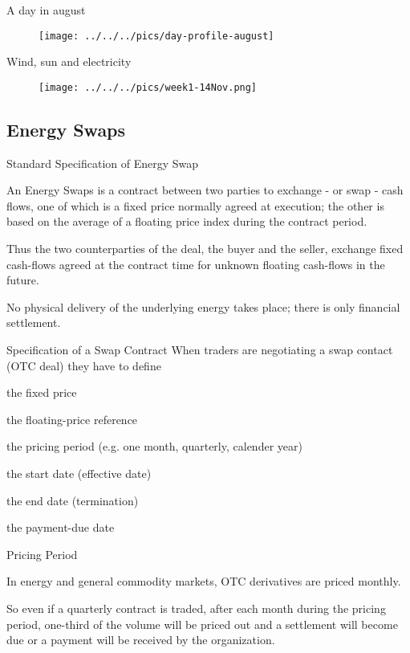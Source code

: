 
{A day in august}
\begin{figure}[htp]
\centering
\texttt{[image: ../../../pics/day-profile-august]}
\end{figure}

{Wind, sun and electricity}
\begin{figure}[htp]
\centering
\texttt{[image: ../../../pics/week1-14Nov.png]}
\end{figure}

\subsection{Energy Swaps}

{Standard Specification of Energy Swap}
\item<1-> An Energy Swaps is a contract between two parties to exchange - or swap - cash flows, one of which is a fixed price normally agreed at execution; the other is based on the average of a floating price index during the contract period.
\item<2-> Thus the two counterparties of the deal, the buyer and the seller, exchange fixed cash-flows agreed at the contract time for unknown floating cash-flows in the future.
\item<3->
No physical delivery of the underlying energy takes place; there is only financial settlement.

{Specification of a Swap Contract}
When traders are negotiating a swap contact (OTC deal) they have to define
  \item<1-> the fixed price
  \item<2-> the floating-price reference
  \item<3-> the pricing period (e.g. one month, quarterly, calender year)
  \item<4-> the start date (effective date)
  \item<5-> the end date (termination)
  \item<6-> the payment-due date

{Pricing Period}
\item<1-> In energy and general commodity markets, OTC derivatives are priced monthly.
\item<2-> So even if a quarterly contract is traded, after each month during the pricing period, one-third of the volume will be priced out and a settlement will become due or a payment will be received by the organization.

